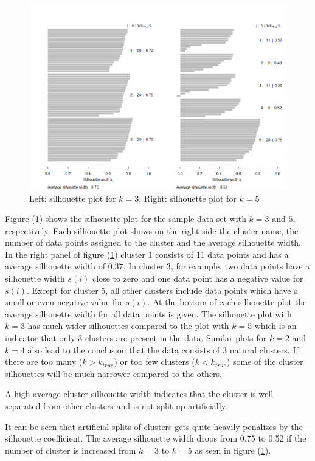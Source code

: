 \begin{figure}
	\centering
	\includegraphics[width=\textwidth]{figures/chapter_k_means/silhouette}
	\caption{Left: silhouette plot for $k=3$; Right: silhouette plot for $k=5$}
	\label{fig:silhouette}
\end{figure}

Figure (\ref{fig:silhouette}) shows the silhouette plot for the sample data set with $k=3 \text{ and } 5$, respectively. Each silhouette plot shows on the right side the cluster name, the number of data points assigned to the cluster and the average silhouette width. In the right panel of figure (\ref{fig:silhouette}) cluster 1 consists of 11 data points and has a average silhouette width of $0.37$. In cluster 3, for example, two data points have a silhouette width $s(i)$ close to zero and one data point has a negative value for $s(i)$. Except for cluster 5, all other clusters include data points which have a small or even negative value for $s(i)$. At the bottom of each silhouette plot the average silhouette width for all data points is given. The silhouette plot with $k=3$ has much wider silhouettes compared to the plot with $k=5$ which is an indicator that only 3 clusters are present in the data. Similar plots for $k=2$ and $k=4$ also lead to the conclusion that the data consists of 3 natural clusters. If there are too many ($k > k_{true}$) or too few clusters ($k < k_{true}$) some of the cluster silhouettes will be much narrower compared to the others.  

\begin{remark}
A high average cluster silhouette width indicates that the cluster is well separated from other clusters and is not split up artificially. 
\end{remark}
\begin{remark}
It can be seen that artificial splits of clusters gets quite heavily penalizes by the silhouette coefficient. The average silhouette width drops from 0.75 to 0.52 if the number of cluster is increased from $k=3$ to $k=5$ as seen in figure (\ref{fig:silhouette}).
\end{remark}

